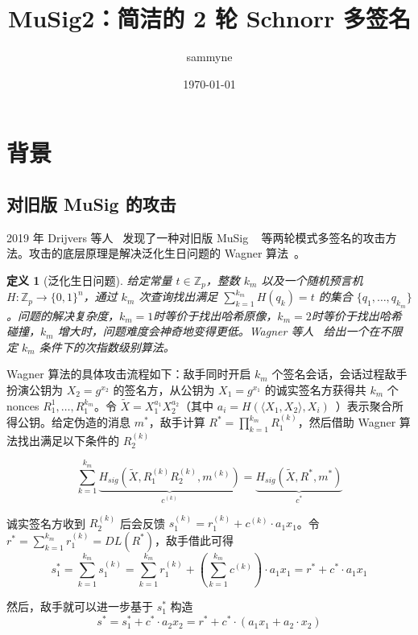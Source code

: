 \documentclass[a4paper,10pt]{article}
\title{MuSig2：简洁的 2 轮 Schnorr 多签名}
\author{sammyne}
\date{\today}
\newcommand{\bZ}{\mathbb{Z}}
\newtheorem{definition}{\bf 定义}[section]
\begin{document}
\maketitle

\section{背景}

\subsection{对旧版 MuSig 的攻击}
2019 年 Drijvers 等人~\cite{2019On} 发现了一种对旧版 MuSig ~\cite{cryptoeprint:2018:068:20180118:124757} 等两轮模式多签名的攻击方法。攻击的底层原理是解决泛化生日问题的 Wagner 算法~\cite{wagner2002generalized}。

\begin{definition}[泛化生日问题]
  给定常量 \(t\in \bZ_p\)，整数 \(k_m\) 以及一个随机预言机 \(H: \bZ_p\rightarrow \{0,1\}^n\)，通过 \(k_m\) 次查询找出满足 \(\sum_{k=1}^{k_m}H(q_k)=t\) 的集合 \(\{q_1,\dots,q_{k_m}\}\)。问题的解决复杂度，\(k_m=1\)时等价于找出哈希原像，\(k_m=2\)时等价于找出哈希碰撞，\(k_m\) 增大时，问题难度会神奇地变得更低。Wagner 等人~\cite{wagner2002generalized} 给出一个在不限定 \(k_m\) 条件下的次指数级别算法。
\end{definition}

Wagner 算法的具体攻击流程如下：敌手同时开启 \(k_m\) 个签名会话，会话过程敌手扮演公钥为 \(X_2=g^{x_2}\) 的签名方，从公钥为 \(X_1=g^{x_1}\) 的诚实签名方获得共 \(k_m\) 个 nonces \(R_1^1,\dots,R_1^{k_m}\)。令 \(\tilde{X}=X_1^{a_1}X_2^{a_2}\)（其中 \(a_i=H(\langle X_1,X_2\rangle,X_i)\)~\cite{cryptoeprint:2018:068:20180118:124757}）表示聚合所得公钥。给定伪造的消息 \(m^*\)，敌手计算 \(R^*=\prod_{k=1}^{k_m} R_1^{(k)}\)，然后借助 Wagner 算法找出满足以下条件的 \(R_2^{(k)}\)

\begin{equation}\label{fake-R2}
  \sum_{k=1}^{k_m} \underbrace{H_{sig}(\tilde{X},R_1^{(k)} R_2^{(k)},m^{(k)})}_{c^{(k)}} = \underbrace{H_{sig}(\tilde{X},R^*,m^*)}_{c^*}
\end{equation}

诚实签名方收到 \(R_2^{(k)}\) 后会反馈 \(s_1^{(k)}=r_1^{(k)}+c^{(k)}\cdot a_1x_1\)。令 \(r^*=\sum_{k=1}^{k_m}r_1^{(k)}=DL(R^*)\)，敌手借此可得
\[
  s_1^* = \sum_{k=1}^{k_m} s_1^{(k)} = \sum_{k=1}^{k_m} r_1^{(k)} + \left(\sum_{k=1}^{k_m} c^{(k)}\right)\cdot a_1x_1 = r^*+c^*\cdot a_1x_1
\]

然后，敌手就可以进一步基于 \(s_1^*\) 构造 
\[
  s^* = s_1^* + c^*\cdot a_2x_2 = r^* + c^*\cdot (a_1x_1+a_2\cdot x_2)
\]
\end{document}
